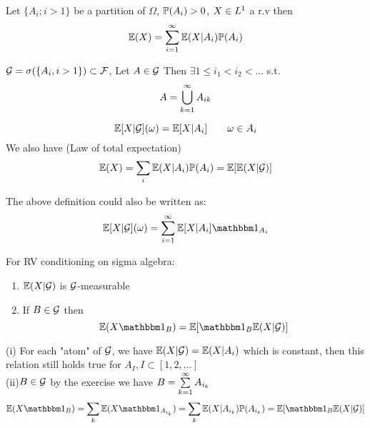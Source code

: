 \begin{thm}
Let $\{A_i ; i>1\}$ be a partition of $\Omega$, $\mathbb{P}(A_i) >0$, $X\in L^{1}$ a r.v then
\begin{equation*}
    \mathbb{E}(X) = \sum\limits_{i=1}^\infty \mathbb{E}(X|A_i)\mathbb{P}(A_i)
\end{equation*}
\end{thm}
\pf
\newpage
\begin{ex}
$\mathcal{G} = \sigma(\{A_i, i>1\}) \subset \mathcal{F}$, Let $A\in \mathcal{G}$ Then $\exists 1 \leq i_1 < i_2 < ... $ s.t. 
\begin{equation*}
A = \bigcup\limits_{k=1}^\infty A_{ik}
\end{equation*}
\end{ex}

\begin{dfn}
\begin{equation*}
    \mathbb{E}[X|\mathcal{G}](\omega) = \mathbb{E}[X|A_i] \qquad \omega \in A_i
\end{equation*}We also have (Law of total expectation)
\begin{equation*}
    \mathbb{E}(X) = \sum\limits_{i}\mathbb{E}(X|A_i)\mathbb{P}(A_i) = \mathbb{E}[\mathbb{E}(X|\mathcal{G})]
\end{equation*}
\end{dfn}
\begin{rem}
The above definition could also be written as:
\begin{equation*}
     \E[X|\setg](\omega) =\bigs{i=1}^\infty \E[X|A_i]\I_{A_i}
\end{equation*}
\end{rem}
\begin{thm} For RV conditioning on sigma algebra:
\begin{enumerate}
    \item $\mathbb{E}(X|\mathcal{G})$ is $\mathcal{G}$-measurable
    \item If $B\in\mathcal{G}$ then
    \begin{equation*}
        \E(X\I_B) = \E[\I_B \E(X|\setg)]
    \end{equation*}
\end{enumerate}
\end{thm}
\pf (i) For each "atom" of $\mathcal{G}$, we have $\mathbb{E}(X|\mathcal{G}) = \mathbb{E}(X|A_i)$ which is constant, then this relation still holds true for $A_I, I\subset [1,2,...]$ \\
(ii)$B\in \mathcal{G}$ by the exercise we have $B = \sum\limits_{k=1}^\infty A_{i_k}$ \begin{equation*}
    \E(X\I_B) = \bigs{k}\E(X\I_{A_{i_k}}) = \bigs{k}\E(X| A_{i_k})\prob(A_{i_k}) = \E[\I_B \E(X|\setg)]
\end{equation*}
